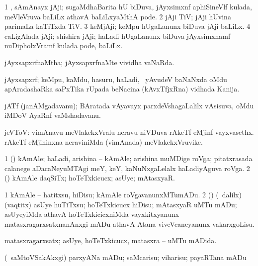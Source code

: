 \noindent
\gl{\pagu}
\bmng
{} 
\bnum
\num{1} ,  sAmAnayx jAji; sugaMdhaBarita hU biDuva, jAyxsimxnf aphiSineVlf kulada, meVleVruva baLiLx athavA baLiLxyaMthA pode. 
\num{2}  jAji TiV; jAji hUvina parimaLa kaTiTxda TiV. 
\num{3}  keMjAji; keMpu hUgaLanunx biDuva jAji baLiLx. 
\num{4}  caLigAlada jAji; shishira jAji; haLadi hUgaLanunx biDuva jAyxsimxnamf nuDipholxVramf kulada pode, baLiLx. 
\enum
\emng
\eentry

\bentry
{}
\gl{\gu}
\bmng
jAyxsapxrfnaMtha; jAyxsapxrfnaMte vividha vaNaRda. 
\emng
\eentry

\bentry
{}
\gl{\nA}
\bmng
jAyxsapxrf; keMpu, kaMdu, hasuru, haLadi, \mo\ yAvudeV baNaNxda oMdu apAradashaRka saPxTika rUpada beNacina (kAvxTfjxRna) vidhada Kanija. 
\emng
\eentry

\bentry
{}
\gl{\nA}
\bmng
jATf (janAMgadavanu); BAratada vAyavayx parxdeVshagaLalilx vAsisuva, oMdu iMDoV AyaRnf vaMshadavanu. 
\emng
\eentry

\bentry
{}
\gl{\nA}
\bmng
jeVToV: 
\banum
{} vimAnavu meVlakekxVralu neravu niVDuva rAkeTf eMjinf vayxvasethx. 
 rAkeTf eMjininxna neraviniMda (vimAnada) meVlakekxVruvike. 
\eanum
\emng
\eentry


\bentry
{}
\gl{\nA}
\bmng
\bnum
\num{1} (\roVshA) kAmAle; haLadi, arishina -- kAmAle; arishina muMDige roVga; pitatxrasada calanege aDacaNeyuMTAgi meY, keY, kaNuNxgaLelalx haLadiyAguva roVga. 
\num{2} (\rUpa) kAmAle daqSiTx; hoTeTxkicucx; asUye; mAtasxyaR. 
\enum
\emng
\eentry

\bentry
{}
\gl{\sakirx}
\bmng
\bnum
\num{1} kAmAle -- hatitxsu, hiDisu; kAmAle roVgavanunxMTumADu. 
\num{2} (\rUpa) (\kanmu\ \BUkaq dalilx) (vaqtitx) asUye huTiTxsu; hoTeTxkicucx hiDisu; mAtasxyaR uMTu mADu; asUyeyiMda athavA hoTeTxkicicxniMda vayxkitxyanunx matasxragarxsatxnanAnxgi mADu athavA Atana viveVcaneyanunx vakarxgoLisu. 
\enum
\emng
\eentry

\bentry
{}
\gl{\gu}
\bmng
matasxragarxsatx; asUye, hoTeTxkicucx, matasxra -- uMTu mADida. 
\emng
\eentry

\bentry
{}
\gl{\akirx}
\bmng
(\kanmu\ saMtoVSakAkxgi) parxyANa mADu; saMcarisu; viharisu; payaRTana mADu 
\emng
\eentry

